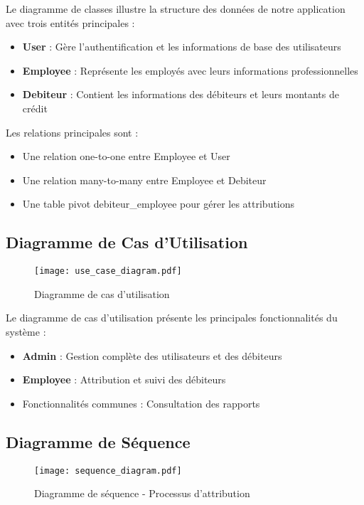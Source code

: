 \documentclass[12pt,a4paper]{report}
\begin{document}
Le diagramme de classes illustre la structure des données de notre application avec trois entités principales :
\begin{itemize}
    \item \textbf{User} : Gère l'authentification et les informations de base des utilisateurs
    \item \textbf{Employee} : Représente les employés avec leurs informations professionnelles
    \item \textbf{Debiteur} : Contient les informations des débiteurs et leurs montants de crédit
\end{itemize}

Les relations principales sont :
\begin{itemize}
    \item Une relation one-to-one entre Employee et User
    \item Une relation many-to-many entre Employee et Debiteur
    \item Une table pivot debiteur\_employee pour gérer les attributions
\end{itemize}

\subsection{Diagramme de Cas d'Utilisation}
\begin{figure}[H]
    \centering
    \texttt{[image: use\_case\_diagram.pdf]}
    \caption{Diagramme de cas d'utilisation}
    \label{fig:use_case_diagram}
\end{figure}

Le diagramme de cas d'utilisation présente les principales fonctionnalités du système :
\begin{itemize}
    \item \textbf{Admin} : Gestion complète des utilisateurs et des débiteurs
    \item \textbf{Employee} : Attribution et suivi des débiteurs
    \item Fonctionnalités communes : Consultation des rapports
\end{itemize}

\subsection{Diagramme de Séquence}
\begin{figure}[H]
    \centering
    \texttt{[image: sequence\_diagram.pdf]}
    \caption{Diagramme de séquence - Processus d'attribution}
    \label{fig:sequence_diagram}
\end{figure}
\end{document}
